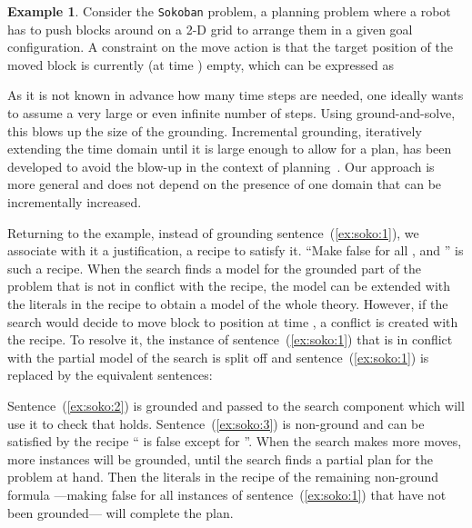\documentclass[11pt]{article}
\theoremstyle{plain}
\theoremstyle{definition}
\theoremstyle{example_basic}
\newtheorem{example}[thm]{Example}
\theoremstyle{example_contd}
\theoremstyle{plain}
\newcommand{\change}[1]{#1}
\begin{document}
\begin{example}\label{ex:sokoban}
Consider the \texttt{Sokoban} problem, a planning problem where a robot
has to push blocks around on a 2-D grid to arrange them in a given goal
configuration.
A constraint on the move action is that the target position  of the moved block  is currently (at time ) empty, which can be expressed as 
 
As it is not known in advance how many time steps are needed, one ideally wants to assume a very large or even infinite number of steps. Using ground-and-solve, this blows up the size of the grounding.
\change{Incremental grounding, iteratively extending the time domain until it is large enough to allow for a plan, has been developed to avoid the blow-up in the context of planning~\shortcite{iclp/GebserKKOST08}. Our approach is more general and does not depend on the presence of one domain that can be incrementally increased.}

\change{Returning to the example, instead of grounding
  sentence~(\ref{ex:soko:1}), we associate with it a justification, a
  recipe to satisfy it. ``Make  false for all
  ,  and '' is such a recipe. When the search finds a model
  for the grounded part of the problem that is not in conflict with
  the recipe, the model can be extended with the literals in the
  recipe to obtain a model of the whole theory. However, if the
  search would decide to move block  to position  at time ,
  a conflict is created with the recipe. To resolve it, the instance
  of sentence~(\ref{ex:soko:1}) that is in conflict with the partial
  model of the search is split off and sentence~(\ref{ex:soko:1})
  is replaced by the equivalent sentences:

Sentence~(\ref{ex:soko:2}) is grounded and passed to the search
component which will use it to check that  holds.
Sentence~(\ref{ex:soko:3}) is non-ground and can be satisfied by
the recipe `` is false except for
''. When the search makes more moves, more
instances will be grounded, until the search finds a partial plan for
the problem at hand. Then the literals in the recipe of the remaining
non-ground formula ---making   false for all 
instances of sentence~(\ref{ex:soko:1}) that have not been grounded--- will complete the plan.
}
\end{example}
\end{document}
